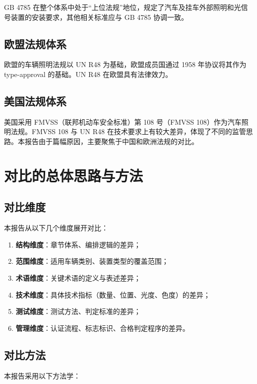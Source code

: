 GB 4785 在整个体系中处于“上位法规”地位，规定了汽车及挂车外部照明和光信号装置的安装要求，其他相关标准应与 GB 4785 协调一致。

\subsection{欧盟法规体系}

欧盟的车辆照明法规以 UN R48 为基础，欧盟成员国通过 1958 年协议将其作为 type-approval 的基础。UN R48 在欧盟具有法律效力。

\subsection{美国法规体系}

美国采用 FMVSS（联邦机动车安全标准）第 108 号（FMVSS 108）作为汽车照明法规。FMVSS 108 与 UN R48 在技术要求上有较大差异，体现了不同的监管思路。本报告由于篇幅原因，主要聚焦于中国和欧洲法规的对比。

\section{对比的总体思路与方法}

\subsection{对比维度}

本报告从以下几个维度展开对比：

\begin{enumerate}[leftmargin=2em]
    \item \textbf{结构维度}：章节体系、编排逻辑的差异；
    \item \textbf{范围维度}：适用车辆类别、装置类型的覆盖范围；
    \item \textbf{术语维度}：关键术语的定义与表述差异；
    \item \textbf{技术维度}：具体技术指标（数量、位置、光度、色度）的差异；
    \item \textbf{测试维度}：测试方法、判定标准的差异；
    \item \textbf{管理维度}：认证流程、标志标识、合格判定程序的差异。
\end{enumerate}

\subsection{对比方法}

本报告采用以下方法学：

